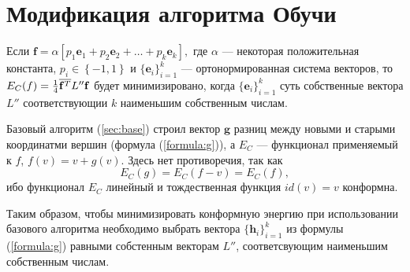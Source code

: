 \section{Модификация алгоритма Обучи}
\label{sec:minimization}

Если $\mathbf{f} = \alpha \left[ p_1 \mathbf{e}_1 + p_2 \mathbf{e}_2 + \dots + p_k \mathbf{e}_k \right],$ 
где $\alpha$ --- некоторая положительная константа, $p_i \in \left\{-1, 1 \right\}$ и 
$\{\mathbf{e}_i\}_{i=1}^k$ --- ортонормированная система векторов, то 
$E_C(f) = \frac{1}{4}\overline{\mathbf{f}^T} L'' \mathbf{f}$ будет минимизировано, 
когда $\{\mathbf{e}_i\}_{i=1}^k$ суть собственные вектора $L''$ соответствующии $k$ наименьшим 
собственным числам. 

Базовый алгоритм (\ref{sec:base}) строил вектор $\mathbf{g}$ разниц между новыми и старыми
координатми вершин (формула (\ref{formula:g})), а $E_C$ --- функционал применяемый к $f$, 
$f(v) = v + g(v)$. Здесь нет противоречия, так как $$E_C(g) = E_C(f - v) = E_C(f),$$ ибо
функционал $E_C$ линейный и тождественная функция $id(v) = v$ конформна. 

Таким образом, чтобы минимизировать конформную энергию при использовании базового алгоритма 
необходимо выбрать вектора $\{\mathbf{h}_i\}_{i=1}^k$ из формулы (\ref{formula:g}) равными собстенным векторам $L''$, соответсвующим наименьшим собственным числам.

